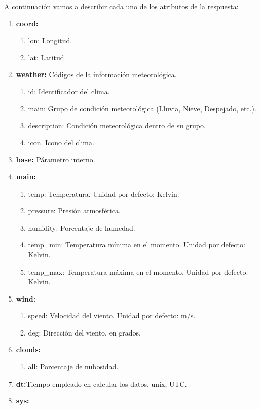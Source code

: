 A continuación vamos a describir cada uno de los atributos de la respuesta:

\begin{enumerate}
\item \textbf{coord:}
\begin{enumerate}
\item lon: Longitud.
\item lat: Latitud.
\end{enumerate}
\item \textbf{weather:} Códigos de la información meteorológica.
\begin{enumerate}
\item id: Identificador del clima.
\item main: Grupo de condición meteorológica (Lluvia, Nieve, Despejado, etc.).
\item description: Condición meteorológica dentro de su grupo.
\item  icon. Icono del clima.
\end{enumerate}
\item  \textbf{base:} Párametro interno.
\item  \textbf{main:}
\begin{enumerate}
\item  temp: Temperatura. Unidad por defecto: Kelvin.
\item  pressure: Presión atmosférica.
\item  humidity: Porcentaje de humedad.
\item  temp\_min: Temperatura mínima en el momento. Unidad por defecto: Kelvin.
\item  temp\_max: Temperatura máxima en el momento. Unidad por defecto: Kelvin.
\end{enumerate}
\item  \textbf{wind:}
\begin{enumerate}
\item speed: Velocidad del viento. Unidad por defecto: m/s.
\item deg: Dirección del viento, en grados.
\end{enumerate}
\item  \textbf{clouds:}
\begin{enumerate}
\item all: Porcentaje de nubosidad.
\end{enumerate}
\item  \textbf{dt:}Tiempo empleado en calcular los datos, unix, UTC.
\item  \textbf{sys:}
\begin{enumerate}

\end{enumerate}
\end{enumerate}

